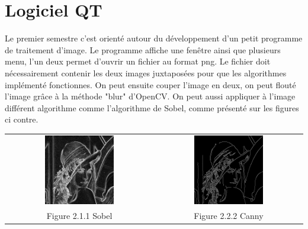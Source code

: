 \documentclass[12pt,a4paper]{report}
\begin{document}
\section{Logiciel QT}
Le premier semestre c'est orienté autour du développement d'un petit programme de traitement d'image. Le programme affiche une fenêtre ainsi que plusieurs menu, l'un deux permet d'ouvrir un fichier au format png.
Le fichier doit nécessairement contenir les deux images juxtaposées pour que les algorithmes implémenté fonctionnes. On peut ensuite couper l'image en deux, on peut flouté l'image grâce à la méthode "blur" d'OpenCV. On peut aussi appliquer à l'image différent algorithme comme l'algorithme de Sobel, comme présenté sur les figures ci contre.
\begin{center}
\begin{tabular}{cc}
  \vspace{0pt} \includegraphics[width=0.49\textwidth]{sobel.jpg} &
  \vspace{0pt} \includegraphics[width=0.49\textwidth]{canny.jpg} \\
    
  Figure 2.1.1 Sobel & Figure 2.2.2 Canny
\end{tabular}
\end{center}
\end{document}
